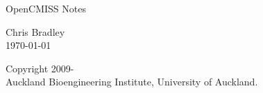 \thispagestyle{empty}

\begin{center}
   \huge OpenCMISS Notes
   \vspace{10mm}   

   \large {}
   \vspace{10mm}   

   \begin{figure}[htbp] \centering
   \end{figure} %

   \vspace{10mm}
   Chris Bradley\\
   \vspace{10mm}
   \today\\   %
   \vspace{25mm}
   \small
   \begin{figure}[htbp] \centering
   \end{figure} %
   \textcopyright \thickspace Copyright 2009-\the\year\\
   Auckland Bioengineering Institute, University of Auckland.
\end{center}





